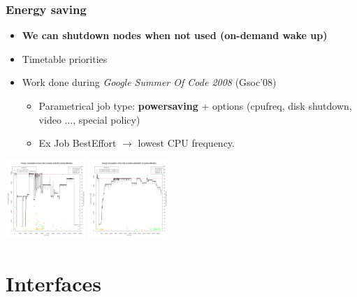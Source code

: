 \documentclass{beamer}
\begin{document}
\begin{frame}
  \frametitle{Energy saving} \hypertarget{energy}{}
  \begin{itemize}
    \item {\bf We can shutdown nodes when not used (on-demand wake up)}
    \item Timetable priorities
		\item Work done during {\em Google Summer Of Code 2008} (Gsoc'08)
    \begin{itemize}
       \item Parametrical job type:  {\bf powersaving} + options (cpufreq, disk shutdown, video ..., special policy)
       \item Ex Job BestEffort $\rightarrow$ lowest CPU frequency.
    \end{itemize}
  \end{itemize}
  \begin{center}
    \includegraphics[width=3cm]{img/energy50.png}
    \includegraphics[width=3cm]{img/energy90.png}
    \\\hyperlink{energy-appendix}{}
  \end{center}
\end{frame}


\section{Interfaces}

\end{document}
